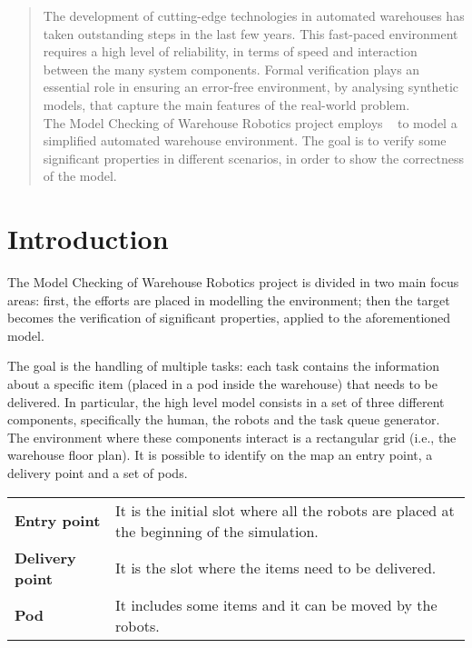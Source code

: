 \begin{abstract}
The development of cutting-edge technologies in automated warehouses has taken outstanding steps in the last few years. 
This fast-paced environment requires a high level of reliability, in terms of speed and interaction between the many system components.
Formal verification plays an essential role in ensuring an error-free environment, by analysing synthetic models, that capture the main features of the real-world problem.\\
The Model Checking of Warehouse Robotics project employs \UPPAAL\ \cite{uppaal} to model a simplified automated warehouse environment. The goal is to verify some significant properties in different scenarios, in order to show the correctness of the model.
\end{abstract}

\section{Introduction}
The Model Checking of Warehouse Robotics project is divided in two main focus areas: first, the efforts are placed in modelling the environment; then the target becomes the verification of significant properties, applied to the aforementioned model.

The goal is the handling of multiple tasks: each task contains the information about a specific item (placed in a pod inside the warehouse) that needs to be delivered. 
In particular, the high level model consists in a set of three different components, specifically the human, the robots and the task queue generator.
The environment where these components interact is a rectangular grid (i.e., the warehouse floor plan). It is possible to identify on the map an entry point, a delivery point and a set of pods.

\begin{tabularx}{\textwidth}{lX}
\textbf{Entry point} & It is the initial slot where all the robots are placed at the beginning of the simulation.\vspace{0,2cm}\\
\textbf{Delivery point} & It is the slot where the items need to be delivered.\vspace{0,2cm}\\
\textbf{Pod} & It includes some items and it can be moved by the robots.\vspace{0,2cm}\\
\end{tabularx}

